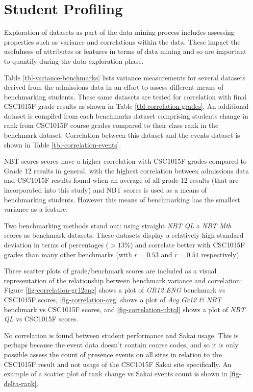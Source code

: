 \section{Student Profiling}
Exploration of datasets as part of the data mining process includes assessing properties such as variance and correlations within the data. These impact the usefulness of attributes or features in terms of data mining and so are important to quantify during the data exploration phase.

Table \ref{tbl-variance-benchmarks} lists variance measurements for several datasets derived from the admissions data in an effort to assess different means of benchmarking students. These same datasets are tested for correlation with final CSC1015F grade results as shown in Table \ref{tbl-correlation-grades}. An additional dataset is compiled from each benchmarks dataset comprising students change in rank from CSC1015F course grades compared to their class rank in the benchmark dataset. Correlation between this dataset and the events dataset is shown in Table \ref{tbl-correlation-events}.





NBT scores scores have a higher correlation with CSC1015F grades compared to Grade 12 results in general, with the highest correlation between admissions data and CSC1015F results found when an average of all grade 12 results (that are incorporated into this study) and NBT scores is used as a means of benchmarking students. However this means of benchmarking has the smallest variance as a feature.

Two benchmarking methods stand out: using straight \textit{NBT QL} a \textit{NBT Mth} scores as benchmark datasets. These datasets display a relatively high standard deviation in terms of percentages ($> 13\%$) and correlate better with CSC1015F grades than many other benchmarks (with $r = 0.53$ and $r = 0.51$ respectively)

Three scatter plots of grade/benchmark scores are included as a visual representation of the relationship between benchmark variance and correlation: Figure \ref{fig-correlation-gr12eng} shows a plot of \textit{GR12 ENG} benchmark vs CSC1015F scores, \ref{fig-correlation-avg} shows a plot of \textit{Avg Gr12 \& NBT} benchmark vs CSC1015F scores, and \ref{fig-correlation-nbtql} shows a plot of \textit{NBT QL} vs CSC1015F scores.

No correlation is found between student performance and Sakai usage. This is perhaps because the event data doesn't contain course codes, and so it is only possible assess the count of presence events on all sites in relation to the CSC1015F result and not usage of the CSC1015F Sakai site specifically. An example of a scatter plot of rank change vs Sakai events count is shown in \ref{fig-delta-rank}.




